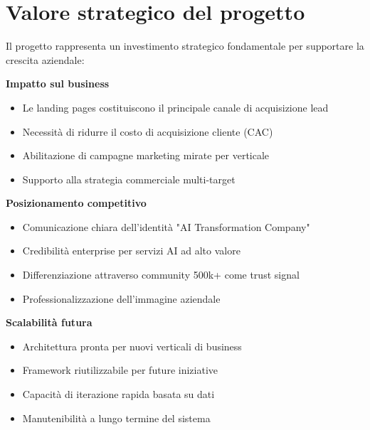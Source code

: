 \section{Valore strategico del progetto}
Il progetto rappresenta un investimento strategico fondamentale per supportare la crescita aziendale:

\textbf{Impatto sul business}
\begin{itemize}
  \item Le landing pages costituiscono il principale canale di acquisizione lead
  \item Necessità di ridurre il costo di acquisizione cliente (CAC)
  \item Abilitazione di campagne marketing mirate per verticale
  \item Supporto alla strategia commerciale multi-target
\end{itemize}

\textbf{Posizionamento competitivo}
\begin{itemize}
  \item Comunicazione chiara dell'identità "AI Transformation Company"
  \item Credibilità enterprise per servizi AI ad alto valore
  \item Differenziazione attraverso community 500k+ come trust signal
  \item Professionalizzazione dell'immagine aziendale
\end{itemize}

\textbf{Scalabilità futura}
\begin{itemize}
  \item Architettura pronta per nuovi verticali di business
  \item Framework riutilizzabile per future iniziative
  \item Capacità di iterazione rapida basata su dati
  \item Manutenibilità a lungo termine del sistema
\end{itemize}